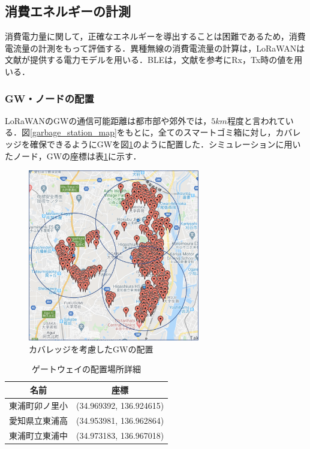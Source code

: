 \documentclass[Japanese]{dicomopapers}
\begin{document}
\subsection{消費エネルギーの計測}
消費電力量に関して，正確なエネルギーを導出することは困難であるため，消費電流量の計測をもって評価する．異種無線の消費電流量の計算は，LoRaWANは文献\cite{lorawan_github}が提供する電力モデルを用いる．BLEは，文献\cite{ble_energy_consumption}を参考にRx，Tx時の値を用いる．

\subsubsection{GW・ノードの配置}
LoRaWANのGWの通信可能距離は都市部や郊外では，$5km$程度と言われている．図\ref{garbage_station_map}をもとに，全てのスマートゴミ箱に対し，カバレッジを確保できるようにGWを図\ref{lorawan_area}のように配置した．シミュレーションに用いたノード，GWの座標は表\ref{tab:gateway_position_detail}に示す．


\begin{figure}[h]
    \centering
    \includegraphics[width=7.5cm]{img/lorawan_area.png}
    \caption{カバレッジを考慮したGWの配置}
    \label{lorawan_area}
\end{figure}

\begin{table}[h]
    \centering
    \caption{ゲートウェイの配置場所詳細}
    \label{tab:gateway_position_detail}
    \begin{tabular}{|c|c|}
    \hline
    \textbf{名前} & \textbf{座標} \\ \hline
    東浦町卯ノ里小 & (34.969392, 136.924615) \\ \hline
    愛知県立東浦高 & (34.953981, 136.962864) \\ \hline
    東浦町立東浦中 & (34.973183, 136.967018) \\ \hline
    \end{tabular}
\end{table}
\end{document}
